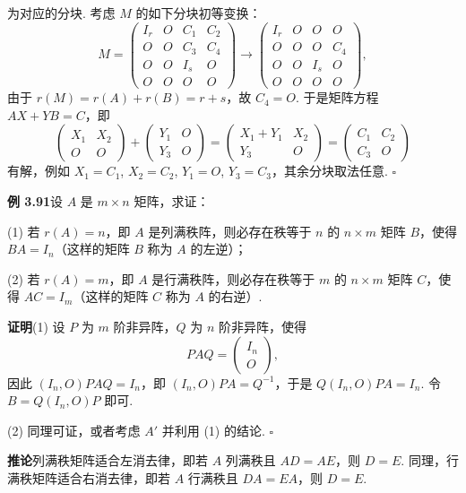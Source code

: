 \documentclass[UTF8,12pt,a4paper,fontset=fandol]{ctexart}
\begin{document}
为对应的分块. 考虑 $M$ 的如下分块初等变换：
\[
M=
\begin{pmatrix}
I_r&O&C_1&C_2\\
O&O&C_3&C_4\\
O&O&I_s&O\\
O&O&O&O
\end{pmatrix}
\longrightarrow
\begin{pmatrix}
I_r&O&O&O\\
O&O&O&C_4\\
O&O&I_s&O\\
O&O&O&O
\end{pmatrix},
\]
由于 $r(M)=r(A)+r(B)=r+s$，故 $C_4=O$. 于是矩阵方程 $AX+YB=C$，即
\[
\begin{pmatrix}X_1&X_2\\O&O\end{pmatrix}
+
\begin{pmatrix}Y_1&O\\Y_3&O\end{pmatrix}
=
\begin{pmatrix}X_1+Y_1&X_2\\Y_3&O\end{pmatrix}
=
\begin{pmatrix}C_1&C_2\\C_3&O\end{pmatrix}
\]
有解，例如 $X_1=C_1$, $X_2=C_2$, $Y_1=O$, $Y_3=C_3$，其余分块取法任意. $\square$

\noindent\textbf{例 3.91}\quad 设 $A$ 是 $m\times n$ 矩阵，求证：

(1) 若 $r(A)=n$，即 $A$ 是列满秩阵，则必存在秩等于 $n$ 的 $n\times m$ 矩阵 $B$，使得 $BA=I_n$（这样的矩阵 $B$ 称为 $A$ 的左逆）；

(2) 若 $r(A)=m$，即 $A$ 是行满秩阵，则必存在秩等于 $m$ 的 $n\times m$ 矩阵 $C$，使得 $AC=I_m$（这样的矩阵 $C$ 称为 $A$ 的右逆）.

\noindent\textbf{证明}\quad (1) 设 $P$ 为 $m$ 阶非异阵，$Q$ 为 $n$ 阶非异阵，使得
\[
PAQ=\begin{pmatrix}I_n\\O\end{pmatrix},
\]
因此 $(I_n,O)PAQ=I_n$，即 $(I_n,O)PA=Q^{-1}$，于是 $Q(I_n,O)PA=I_n$. 令 $B=Q(I_n,O)P$ 即可.

(2) 同理可证，或者考虑 $A'$ 并利用 (1) 的结论. $\square$

\noindent\textbf{推论}\quad 列满秩矩阵适合左消去律，即若 $A$ 列满秩且 $AD=AE$，则 $D=E$. 同理，行满秩矩阵适合右消去律，即若 $A$ 行满秩且 $DA=EA$，则 $D=E$.
\end{document}
